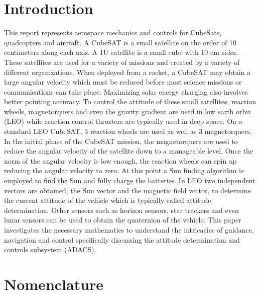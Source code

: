 \documentclass{article}
\begin{document}
\newpage

\tableofcontents

\newpage


\section{Introduction}

This report represents aerospace mechanics and controls for CubeSats,
quadcopters and aircraft. A CubeSAT is a small satellite on the order
of 10 centimeters along each axis. A 1U satellite is a small cube with
10 cm sides. These satellites are used for a variety of missions and
created by a variety of different organizations. When deployed from 
a rocket, a CubeSAT may obtain a large angular velocity
which must be reduced before most science missions or communications
can take place. Maximizing solar energy charging also involves
better pointing accuracy. To control the attitude of these small
satellites, reaction wheels, magnetorquers and even the gravity
gradient are used in low earth orbit (LEO) while reaction control thrusters
are typically used in deep space.  On a standard LEO CubeSAT, 3 reaction
wheels are used as well as 3 magnetorquers. In the initial phase of
the CubeSAT mission, the magnetorquers are used to reduce the angular
velocity of the satellite down to a manageable level. Once the norm of the angular velocity is
low enough, the reaction wheels can spin up reducing the angular
velocity to zero. At this point a Sun finding algorithm is employed to
find the Sun and fully charge the batteries. In LEO two independent
vectors are obtained, the Sun vector and the magnetic field vector, to
determine the current attitude of the vehicle which is typically
called attitude determination. Other sensors such as horizon sensors,
star trackers and even lunar sensors can be used to obtain the
quaternion of the vehicle. This paper investigates the necessary
mathematics to understand the intricacies of guidance, navigation and
control specifically discussing the attitude determination and
controls subsystem (ADACS).

\section{Nomenclature}
\end{document}
